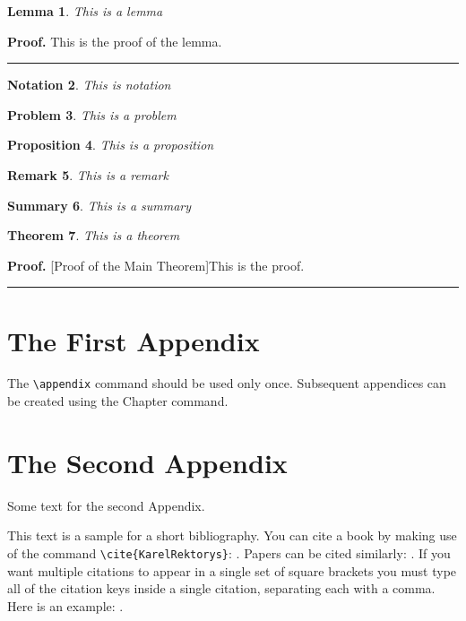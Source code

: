 \documentclass[letterpaper,12pt,openany,reqno]{book}%
\newtheorem{theorem}{Theorem}
\newtheorem{lemma}[theorem]{Lemma}
\newtheorem{notation}[theorem]{Notation}
\newtheorem{problem}[theorem]{Problem}
\newtheorem{proposition}[theorem]{Proposition}
\newtheorem{remark}[theorem]{Remark}
\newtheorem{summary}[theorem]{Summary}
\newenvironment{proof}[1][Proof]{\textbf{#1.} }{\ \rule{0.5em}{0.5em}}
\begin{document}
\begin{lemma}
This is a lemma
\end{lemma}

\begin{proof}
This is the proof of the lemma.
\end{proof}

\begin{notation}
This is notation
\end{notation}

\begin{problem}
This is a problem
\end{problem}

\begin{proposition}
This is a proposition
\end{proposition}

\begin{remark}
This is a remark
\end{remark}

\begin{summary}
This is a summary
\end{summary}

\begin{theorem}
This is a theorem
\end{theorem}

\begin{proof}
[Proof of the Main Theorem]This is the proof.
\end{proof}

\appendix

\chapter{The First Appendix}

The \verb"\appendix" command should be used only once. Subsequent appendices can
be created using the Chapter command.

\chapter{The Second Appendix}

Some text for the second Appendix.

This text is a sample for a short bibliography. You can cite a book by making use of
the command \verb"\cite{KarelRektorys}": \cite{KarelRektorys}. Papers can be cited
similarly: \cite{Bertoti97}. If you want multiple citations to appear in a single set
of square brackets you must type all of the citation keys inside a single citation,
separating each with a comma. Here is an example: \cite{Bertoti97, Szeidl2001,
Carlson67}.
\end{document}

